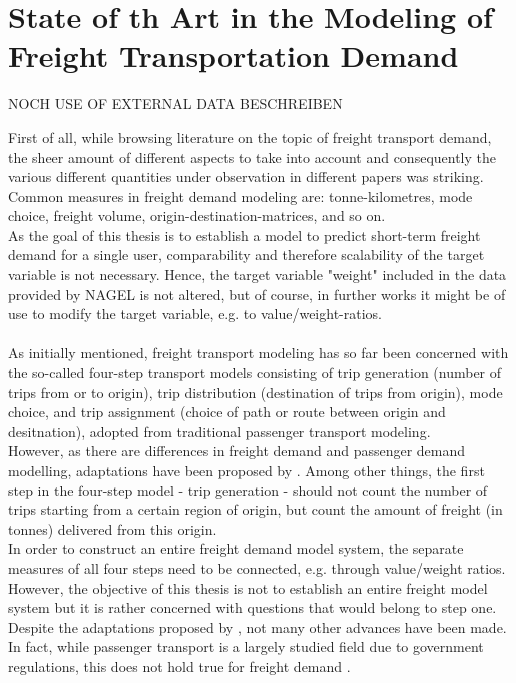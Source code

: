 \documentclass[a4paper, 11pt]{article}
\begin{document}
\section{State of th Art in the Modeling of Freight Transportation Demand}

NOCH USE OF EXTERNAL DATA BESCHREIBEN

First of all, while browsing literature on the topic of freight transport demand, the sheer amount of different aspects to take into account and consequently the various different quantities under observation in different papers was striking. Common measures in freight demand modeling are: tonne-kilometres, mode choice, freight volume, origin-destination-matrices, and so on.\\
As the goal of this thesis is to establish a model to predict short-term freight demand for a single user, comparability and therefore scalability of the target variable is not necessary. Hence, the target variable "weight" included in the data provided by NAGEL is not altered, but of course, in further works it might be of use to modify the target variable, e.g. to value/weight-ratios.
\\
\\
As initially mentioned, freight transport modeling has so far been concerned with the so-called four-step transport models consisting of trip generation (number of trips from or to origin), trip distribution (destination of trips from origin), mode choice, and trip assignment (choice of path or route between origin and desitnation), adopted from traditional passenger transport modeling\citep{JONG.2004, TransportandInfrastructureCouncil.2016}.
\\
However, as there are differences in freight demand and passenger demand modelling, adaptations have been proposed by \cite{JONG.2004}.
Among other things, the first step in the four-step model - trip generation - should not count the number of trips starting from a certain region of origin, but count the amount of freight (in tonnes) delivered from this origin.\\
In order to construct an entire freight demand model system, the separate measures of all four steps need to be connected, e.g. through value/weight ratios.\\
However, the objective of this thesis is not to establish an entire freight model system but it is rather concerned with questions that would belong to step one.\\
Despite the adaptations proposed by \cite{JONG.2004}, not many other advances have been made. In fact, while passenger transport is a largely studied field due to government regulations, this does not hold true for freight demand \citep{Regan.2001}.\\
\end{document}
